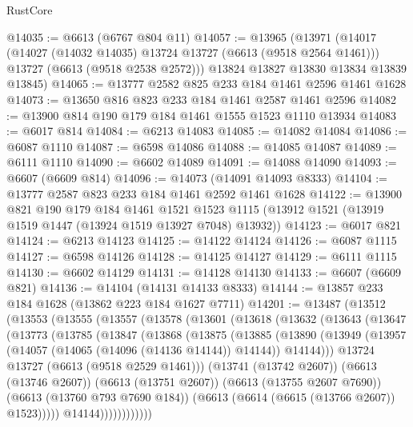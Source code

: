 \begin{lexlean}{RustCore}
\begin{coremodule}
@14035 := @6613 (@6767 @804 @11)
@14057 := @13965
    (@13971
      (@14017
        (@14027 (@14032 @14035) @13724 @13727 (@6613 (@9518 @2564 @1461)))
        @13727
        (@6613 (@9518 @2538 @2572)))
      @13824
      @13827
      @13830
      @13834
      @13839
      @13845)
@14065 := @13777 @2582 @825 @233 @184 @1461 @2596 @1461 @1628
@14073 := @13650 @816 @823 @233 @184 @1461 @2587 @1461 @2596
@14082 := @13900 @814 @190 @179 @184 @1461 @1555 @1523 @1110 @13934
@14083 := @6017 @814
@14084 := @6213 @14083
@14085 := @14082 @14084
@14086 := @6087 @1110
@14087 := @6598 @14086
@14088 := @14085 @14087
@14089 := @6111 @1110
@14090 := @6602 @14089
@14091 := @14088 @14090
@14093 := @6607 (@6609 @814)
@14096 := @14073 (@14091 @14093 @8333)
@14104 := @13777 @2587 @823 @233 @184 @1461 @2592 @1461 @1628
@14122 := @13900
    @821
    @190
    @179
    @184
    @1461
    @1521
    @1523
    @1115
    (@13912 @1521 (@13919 @1519 @1447 (@13924 @1519 @13927 @7048) @13932))
@14123 := @6017 @821
@14124 := @6213 @14123
@14125 := @14122 @14124
@14126 := @6087 @1115
@14127 := @6598 @14126
@14128 := @14125 @14127
@14129 := @6111 @1115
@14130 := @6602 @14129
@14131 := @14128 @14130
@14133 := @6607 (@6609 @821)
@14136 := @14104 (@14131 @14133 @8333)
@14144 := @13857 @233 @184 @1628 (@13862 @223 @184 @1627 @7711)
@14201 := @13487
    (@13512
      (@13553
        (@13555
          (@13557
            (@13578
              (@13601
                (@13618
                  (@13632
                    (@13643
                      (@13647
                        (@13773
                          (@13785
                            (@13847
                              (@13868
                                (@13875
                                  (@13885
                                    (@13890
                                      (@13949
                                        (@13957
                                          (@14057 (@14065 (@14096 (@14136 @14144)) @14144))
                                          @14144)))
                                    @13724
                                    @13727
                                    (@6613 (@9518 @2529 @1461)))
                                  (@13741 (@13742 @2607))
                                  (@6613 (@13746 @2607))
                                  (@6613 (@13751 @2607))
                                  (@6613 (@13755 @2607 @7690))
                                  (@6613 (@13760 @793 @7690 @184))
                                  (@6613 (@6614 (@6615 (@13766 @2607)) @1523)))))
                            @14144))))))))))))

\end{coremodule}
\end{lexlean}
